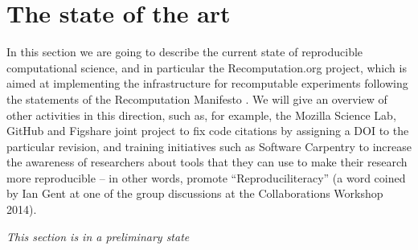 \section{The state of the art}
\label{s:recomputation}

In this section we are going to describe the current state of reproducible computational science, and
in particular the Recomputation.org project, which is aimed at implementing
the infrastructure for recomputable experiments following the statements of the Recomputation
Manifesto \cite{gent:recomputation}. We will give an overview of other activities in this
direction, such as, for example, the Mozilla Science Lab, GitHub and Figshare joint project to fix code
citations by assigning a DOI to the particular revision, and training initiatives such as Software
Carpentry to increase the awareness of researchers about tools that they can use to make their
research more reproducible -- in other words, promote ``Reproduciliteracy'' (a word coined by 
Ian Gent at one of the group discussions at the Collaborations Workshop 2014).

\emph{This section is in a preliminary state}

